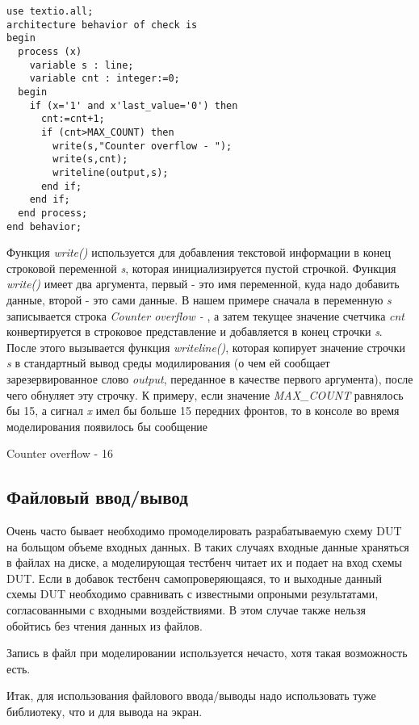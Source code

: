 \begin{Code}
\begin{lstlisting}[caption=Вывод в консоль]
use textio.all;
architecture behavior of check is
begin
  process (x)
    variable s : line;
    variable cnt : integer:=0;
  begin
    if (x='1' and x'last_value='0') then
      cnt:=cnt+1;
      if (cnt>MAX_COUNT) then
        write(s,"Counter overflow - ");
        write(s,cnt);
        writeline(output,s);
      end if;
    end if;
  end process;
end behavior;
\end{lstlisting}
\end{Code}


Функция \emph{write()} используется для добавления текстовой информации в конец строковой переменной \emph{s}, которая инициализируется пустой строчкой. Функция \emph{write()} имеет два аргумента, первый - это имя переменной, куда надо добавить данные, второй - это сами данные. В нашем примере сначала в переменную \emph{s} записывается строка \emph{Counter overflow - }, а затем текущее значение счетчика \emph{cnt} конвертируется в строковое представление и добавляется в конец строчки \emph{s}. После этого вызывается функция \emph{writeline()}, которая копирует значение строчки \emph{s} в стандартный вывод среды модилирования (о чем ей сообщает зарезервированное слово \emph{output}, переданное в качестве первого аргумента), после чего обнуляет эту строчку. К примеру, если значение \emph{MAX\_COUNT} равнялось бы 15, а сигнал \emph{x} имел бы больше 15 передних фронтов, то в консоле во время моделирования появилось бы сообщение

Counter overflow - 16

\subsection{Файловый ввод/вывод}

Очень часто бывает необходимо промоделировать разрабатываемую схему DUT на больщом объеме входных данных. В таких случаях входные данные храняться в файлах на диске, а моделирующая тестбенч читает их и подает на вход схемы DUT. Если в добавок тестбенч самопроверяющаяся, то и выходные данный схемы DUT необходимо сравнивать с известными опроными результатами, согласованными с входными воздействиями. В этом случае также нельзя обойтись без чтения данных из файлов.

Запись в файл при моделировании используется нечасто, хотя такая возможность есть.

Итак, для использования файлового ввода/выводы надо использовать туже библиотеку, что и для вывода на экран.

